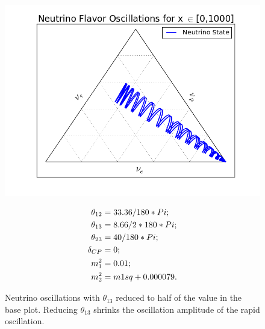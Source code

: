 \documentclass[letterpaper,12pt,english]{sphinxmanual}
\begin{document}
\begin{figure}[htbp]
\centering
\capstart

\includegraphics{1000-3.png}
\caption{Neutrino oscillations with \(\theta_{13}\) reduced to half of the value in the base plot. Reducing \(\theta_{13}\) shrinks the oscillation amplitude of the rapid oscillation.}{\small \begin{gather}
\begin{split}\theta_{12} &= 33.36/180*Pi; \\
\theta_{13} &= 8.66/ 2* 180 *Pi; \\
\theta_{23} &= 40/180*Pi;\\
\delta_{CP} &= 0;\\
m_1^2 &= 0.01;\\
m_2^2 &= m1sq + 0.000079.\end{split}\notag
\end{gather}}\end{figure}
\end{document}
